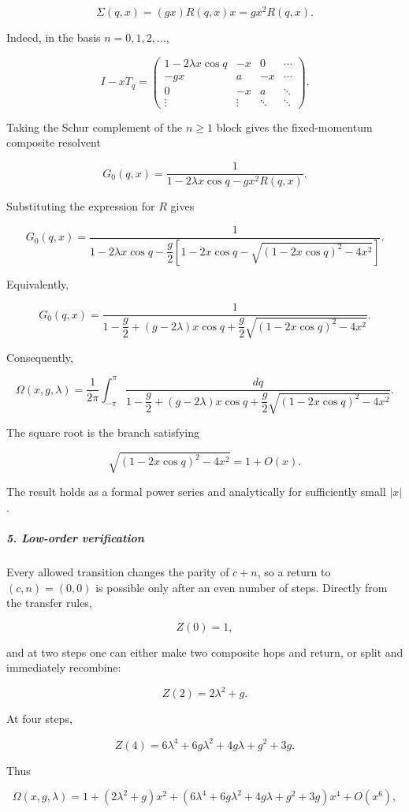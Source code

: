 \[
\Sigma(q,x)=(gx)R(q,x)x=g x^2R(q,x).
\]

Indeed, in the basis $n=0,1,2,\ldots$,

\[
I-xT_q=
\begin{pmatrix}
1-2\lambda x\cos q&-x&0&\cdots\\
-gx&a&-x&\cdots\\
0&-x&a&\ddots\\
\vdots&\vdots&\ddots&\ddots
\end{pmatrix}.
\]

Taking the Schur complement of the $n\geq1$ block gives the fixed-momentum composite resolvent

\[
G_0(q,x) = \frac{1}{ 1-2\lambda x\cos q-gx^2R(q,x) }.
\]

Substituting the expression for $R$ gives

\[
G_0(q,x) = \frac{1}{ 1-2\lambda x\cos q -\dfrac{g}{2} \left[ 1-2x\cos q -\sqrt{\left(1-2x\cos q\right)^2-4x^2} \right] }.
\]

Equivalently,

\[
G_0(q,x) = \frac{1}{ 1-\dfrac g2 +(g-2\lambda)x\cos q +\dfrac g2 \sqrt{\left(1-2x\cos q\right)^2-4x^2} }.
\]

Consequently,

\[
{ \Omega(x,g,\lambda) = \frac{1}{2\pi} \int_{-\pi}^{\pi} \frac{dq}{ 1-\dfrac g2 +(g-2\lambda)x\cos q +\dfrac g2 \sqrt{\left(1-2x\cos q\right)^2-4x^2} } }.
\]

The square root is the branch satisfying

\[
\sqrt{\left(1-2x\cos q\right)^2-4x^2} =1+O(x).
\]

The result holds as a formal power series and analytically for sufficiently small $|x|$.

\subparagraph*{5. Low-order verification}

Every allowed transition changes the parity of $c+n$, so a return to $(c,n)=(0,0)$ is possible only after an even number of steps. Directly from the transfer rules,

\[
Z(0)=1,
\]

and at two steps one can either make two composite hops and return, or split and immediately recombine:

\[
Z(2)=2\lambda^2+g.
\]

At four steps,

\[
Z(4) = 6\lambda^4 +6g\lambda^2 +4g\lambda +g^2+3g.
\]

Thus

\[
\Omega(x,g,\lambda) = 1+(2\lambda^2+g)x^2 + \left( 6\lambda^4+6g\lambda^2+4g\lambda+g^2+3g \right)x^4 +O(x^6),
\]

